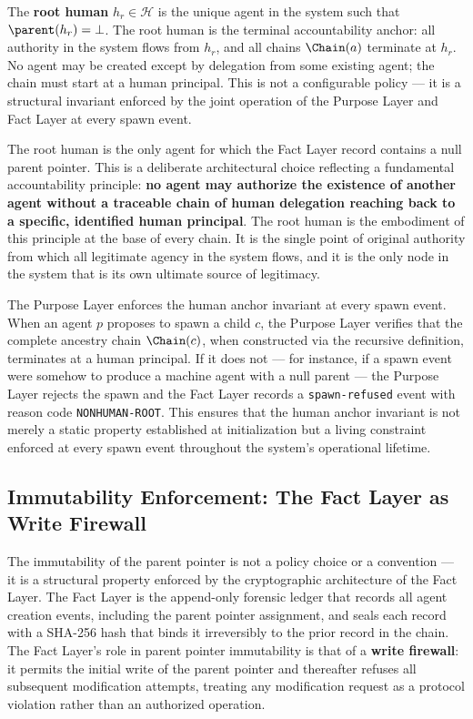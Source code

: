 \begin{definition}
\label{def:root_human}
The \textbf{root human} $h_r \in \mathcal{H}$ is the unique agent in the system such that $\parent(h_r) = \bot$. The root human is the terminal accountability anchor: all authority in the system flows from $h_r$, and all chains $\Chain(a)$ terminate at $h_r$. No agent may be created except by delegation from some existing agent; the chain must start at a human principal. This is not a configurable policy — it is a structural invariant enforced by the joint operation of the Purpose Layer and Fact Layer at every spawn event.
\end{definition}

The root human is the only agent for which the Fact Layer record contains a null parent pointer. This is a deliberate architectural choice reflecting a fundamental accountability principle: \textbf{no agent may authorize the existence of another agent without a traceable chain of human delegation reaching back to a specific, identified human principal}. The root human is the embodiment of this principle at the base of every chain. It is the single point of original authority from which all legitimate agency in the system flows, and it is the only node in the system that is its own ultimate source of legitimacy.

The Purpose Layer enforces the human anchor invariant at every spawn event. When an agent $p$ proposes to spawn a child $c$, the Purpose Layer verifies that the complete ancestry chain $\Chain(c)$, when constructed via the recursive definition, terminates at a human principal. If it does not — for instance, if a spawn event were somehow to produce a machine agent with a null parent — the Purpose Layer rejects the spawn and the Fact Layer records a \texttt{spawn-refused} event with reason code \texttt{NONHUMAN-ROOT}. This ensures that the human anchor invariant is not merely a static property established at initialization but a living constraint enforced at every spawn event throughout the system's operational lifetime.

\subsection{Immutability Enforcement: The Fact Layer as Write Firewall}
\label{sec:fact_layer_immutability}

The immutability of the parent pointer is not a policy choice or a convention — it is a structural property enforced by the cryptographic architecture of the Fact Layer. The Fact Layer is the append-only forensic ledger that records all agent creation events, including the parent pointer assignment, and seals each record with a SHA-256 hash that binds it irreversibly to the prior record in the chain. The Fact Layer's role in parent pointer immutability is that of a \textbf{write firewall}: it permits the initial write of the parent pointer and thereafter refuses all subsequent modification attempts, treating any modification request as a protocol violation rather than an authorized operation.

